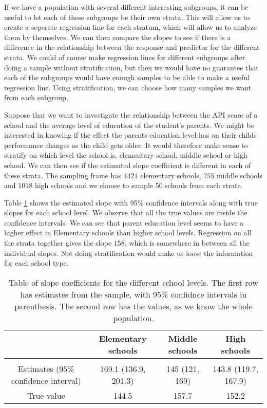 \documentclass{article}
\begin{document}
If we have a population with several different interesting subgroups, it can be
useful to let each of these subgroups be their own strata. This will allow us to
create a seperate regression line for each stratum, which will allow us to
analyze them by themselves. We can then compare the slopes to see if there is a difference in the relationship between the
response and predictor for the different strata. We could of course make
regression lines for different subgroups after doing a sample without stratification,
but then we would have no guarantee that each of the subgroups would have enough
samples to be able to make a useful regression line. Using stratification, we can
choose how many samples we want from each subgroup.

\begin{example}
  Suppose that we want to investigate the relationship between the API score of
  a school and the average level of education of the student's parents. We might
  be interested in knowing if the effect the parents education level has on
  their childs performance changes as the child gets older. It would therefore make
  sense to stratify on which level the school is, elementary school, middle
  school or high school. We can then see if the estimated slope coefficient is
  different in each of these strata.
  The sampling frame has \(4421\) elementary schools, \(755\) middle schools and
  \(1018\) high schools and we choose to sample \(50\) schools from each strata.

  Table \ref{tab:exStrat} shows the estimated slope with 95\% confidence intervals along with
  true slopes for each school level. We observe that all the true values are
  inside the confidence intervals. We can see that
  parent education level seems to have a higher effect in Elementary schools
  than higher school levels. Regression on all the strata together gives the
  slope \(158\), which is somewhere in between all the individual slopes. Not
  doing stratification would make us loose the information for each
  school type.

  \begin{table}
    \centering
  \begin{tabular}{c|ccc}
    & Elementary schools & Middle schools & High schools \\
    \hline \\
    Estimates (95\% confidence interval) & 169.1 (136.9, 201.3) & 145 (121, 169) & 143.8 (119.7, 167.9) \\
    True value & 144.5 & 157.7 & 152.2
  \end{tabular}
  \label{tab:exStrat}
  \caption{Table of slope coefficients for the different school levels. The
    first row has estimates from the sample, with 95\% confidnce intervals in
    parenthesis. The second row has the values, as we know the whole population.}
  \end{table}
\end{example}
\end{document}
